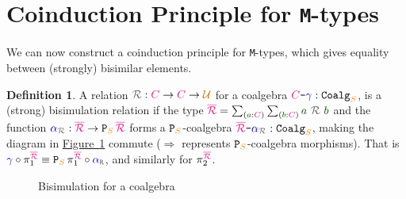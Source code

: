 \documentclass[twoside,11pt,openright]{report}
\theoremstyle{plain} %
\theoremstyle{definition}
\newtheorem{defn}[thm]{Definition}%
\theoremstyle{remark}
\newcommand*{\figref}[1]{\hyperref[fig:#1]{Figure~\ref*{fig:#1}}}
\newcommand*{\term}[1]{\textcolor{green!30!black}{#1}} %
\newcommand*{\type}[1]{\textcolor{magenta!90!black}{#1}}
\newcommand*{\container}[1]{\textcolor{orange}{#1}}
\newcommand*{\universe}[1]{\textcolor{orange!80!black}{#1}}
\newcommand*{\coalg}[2]{#1\texttt{-}#2}
\newcommand*{\relation}[1]{\textcolor{gray!75!black}{\ensuremath{\mathtt{#1}}}}
\newcommand*{\function}[1]{\textcolor{blue!60!black}{\ensuremath{\mathtt{#1}}}}
\newcommand*{\typeformer}[1]{\ensuremath{\mathtt{#1}}}
\newcommand*{\functor}[1]{\ensuremath{\mathbf{\mathtt{#1}}}}
\begin{document}
\section{Coinduction Principle for \texttt{M}-types}
We can now construct a coinduction principle for \texttt{M}-types, which gives equality between (strongly) bisimilar elements.
\begin{defn}
  A relation \(\relation{\mathcal{R}} : \type{C} \rightarrow \type{C} \rightarrow \universe{\mathcal{U}}\) for a coalgebra \(\coalg{\type{C}}{\function{\gamma}} : \typeformer{Coalg}_{\container{S}}\), is a (strong) bisimulation relation if the type \(\type{\overline{\mathcal{R}}} = \sum_{(\term{a} : \type{C})} \sum_{(\term{b} : \type{C})} \term{a}~\relation{\mathcal{R}}~\term{b}\) and the function \(\function{\alpha}_{\relation{\mathcal{R}}} : \type{\overline{\mathcal{R}}} \rightarrow \functor{P}_{\container{S}}\,\type{\overline{\mathcal{R}}}\) forms a \(\functor{P}_{\container{S}}\)-coalgebra \(\coalg{\type{\overline{\mathcal{R}}}}{\function{\alpha}_{\relation{\mathcal{R}}}} : \mathtt{Coalg}_{\container{S}}\), making the diagram in \figref{coalgebra-coinduction-definition} commute (\(\Longrightarrow\) represents \(\functor{P}_{\container{S}}\)-coalgebra morphisms). That is \(\function{\gamma} \circ \pi_1^{\type{\overline{\mathcal{R}}}} \equiv \functor{P}_{\container{S}}\,\pi_1^{\type{\overline{\mathcal{R}}}} \circ \function{\alpha}_{\relation{R}}\), and similarly for \(\pi_2^{\type{\overline{\mathcal{R}}}}\).
  \begin{figure}[h]
    \centering
    \caption{Bisimulation for a coalgebra}
    \label{fig:coalgebra-coinduction-definition}
  \end{figure}
\end{defn}
\end{document}

